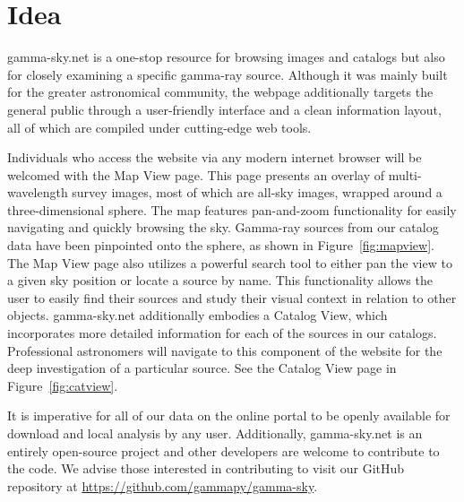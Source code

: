 \section{Idea}

%
%
%
%
%
%
%
%


    gamma-sky.net is a one-stop resource for browsing images and catalogs but also for closely examining a specific gamma-ray source.
    Although it was mainly built for the greater astronomical community, the webpage additionally targets the general public through a
    user-friendly interface and a clean information layout, all of which are compiled under cutting-edge web tools.

    Individuals who access the website via any modern internet browser will be welcomed with the Map View page.
    This page presents an overlay of multi-wavelength survey images, most of which are all-sky images, wrapped around a three-dimensional sphere.
    The map features pan-and-zoom functionality for easily navigating and quickly browsing the sky. Gamma-ray sources from
    our catalog data have been pinpointed onto the sphere, as shown in Figure~\ref{fig:mapview}. The Map View page also utilizes a powerful search tool to either pan the view to a given sky position or locate a source by name. This functionality allows the user to easily find their sources and study their visual context in relation to other objects.
    gamma-sky.net additionally embodies a Catalog View, which incorporates more detailed information for each of the sources in our catalogs.
    Professional astronomers will navigate to this component of the website for the deep investigation of a particular source.
    See the Catalog View page in Figure~\ref{fig:catview}.

    It is imperative for all of our data on the online portal to be openly available for download and local analysis by any user. Additionally, gamma-sky.net is an entirely open-source project and other developers are welcome to contribute to the code. We advise those interested in contributing to visit our GitHub repository at \url{https://github.com/gammapy/gamma-sky}.
